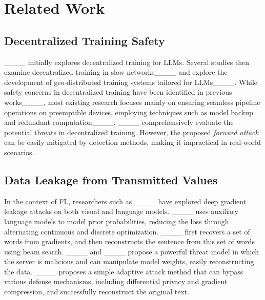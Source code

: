 \section{Related Work}
\subsection{Decentralized Training Safety}

____ initially explores decentralized training for LLMs. Several studies then examine decentralized training in slow networks____ and explore the development of geo-distributed training systems tailored for LLMs____. While safety concerns in decentralized training have been identified in previous works____, most existing research focuses mainly on ensuring seamless pipeline operations on preemptible devices, employing techniques such as model backup and redundant computation____. ____ comprehensively evaluate the potential threats in decentralized training. However, the proposed \textit{forward attack} can be easily mitigated by detection methods, making it impractical in real-world scenarios.




\subsection{Data Leakage from Transmitted Values}

In the context of FL, researchers such as ____ have explored deep gradient leakage attacks on both visual and language models. 
____ uses auxiliary language models to model prior probabilities, reducing the loss through alternating continuous and discrete optimization. ____ first recovers a set of words from gradients, and then reconstructs the sentence from this set of words using beam search. ____ and ____ propose a powerful threat model in which the server is malicious and can manipulate model weights, easily reconstructing the data.
____ proposes a simple adaptive attack method that can bypass various defense mechanisms, including differential privacy and gradient compression, and successfully reconstruct the original text.

